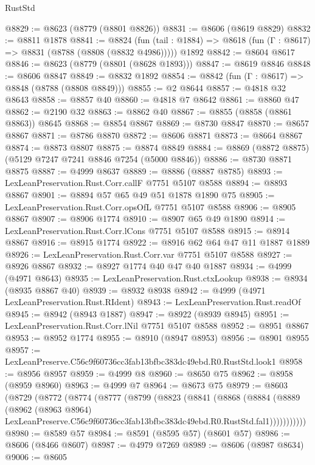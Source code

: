 \begin{lexlean}{RustStd}
\begin{coremodule}
@8829 := @8623 (@8779 (@8801 @8826))
@8831 := @8606 (@8619 @8829)
@8832 := @8811 @1878
@8841 := @8824
    (fun (tail : @1884) => @8618 (fun (Γ : @8617) => @8831 (@8788 (@8808 (@8832 @4986)))))
    @1892
@8842 := @8604 @8617
@8846 := @8623 (@8779 (@8801 (@8628 @1893)))
@8847 := @8619 @8846
@8848 := @8606 @8847
@8849 := @8832 @1892
@8854 := @8842 (fun (Γ : @8617) => @8848 (@8788 (@8808 @8849)))
@8855 := @2 @8644
@8857 := @4818 @32 @8643
@8858 := @8857 @40
@8860 := @4818 @7 @8642
@8861 := @8860 @47
@8862 := @2190 @32
@8863 := @8862 @40
@8867 := @8855 (@8858 (@8861 @8863)) @8645
@8868 := @8854 @8867
@8869 := @8730 @8847
@8870 := @8657 @8867
@8871 := @8786 @8870
@8872 := @8606 @8871
@8873 := @8664 @8867
@8874 := @8873 @8807
@8875 := @8874 @8849
@8884 := @8869 (@8872 @8875) (@5129 @7247 @7241 @8846 @7254 (@5000 @8846))
@8886 := @8730 @8871 @8875
@8887 := @4999 @8637
@8889 := @8886 (@8887 @8785)
@8893 := LexLeanPreservation.Rust.Corr.callF @7751 @5107 @8588
@8894 := @8893 @8867
@8901 := @8894 @57 @65 @49 @51 @1878 @1890 @75
@8905 := LexLeanPreservation.Rust.Corr.opsOfL @7751 @5107 @8588
@8906 := @8905 @8867
@8907 := @8906 @1774
@8910 := @8907 @65 @49 @1890
@8914 := LexLeanPreservation.Rust.Corr.lCons @7751 @5107 @8588
@8915 := @8914 @8867
@8916 := @8915 @1774
@8922 := @8916 @62 @64 @47 @11 @1887 @1889
@8926 := LexLeanPreservation.Rust.Corr.var @7751 @5107 @8588
@8927 := @8926 @8867
@8932 := @8927 @1774 @40 @47 @40 @1887
@8934 := @4999 (@4971 @8643)
@8935 := LexLeanPreservation.Rust.ctxLookup
@8938 := @8934 (@8935 @8867 @40)
@8939 := @8932 @8938
@8942 := @4999 (@4971 LexLeanPreservation.Rust.RIdent)
@8943 := LexLeanPreservation.Rust.readOf
@8945 := @8942 (@8943 @1887)
@8947 := @8922 (@8939 @8945)
@8951 := LexLeanPreservation.Rust.Corr.lNil @7751 @5107 @8588
@8952 := @8951 @8867
@8953 := @8952 @1774
@8955 := @8910 (@8947 @8953)
@8956 := @8901 @8955
@8957 := LexLeanPreserve.C56c9f60736cc3fab13bfbc383dc49ebd.R0.RustStd.look1
@8958 := @8956 @8957
@8959 := @4999 @8
@8960 := @8650 @75
@8962 := @8958 (@8959 @8960)
@8963 := @4999 @7
@8964 := @8673 @75
@8979 := @8603
    (@8729
      (@8772
        (@8774
          (@8777
            (@8799
              (@8823
                (@8841
                  (@8868
                    (@8884
                      (@8889
                        (@8962
                          (@8963 @8964)
                          LexLeanPreserve.C56c9f60736cc3fab13bfbc383dc49ebd.R0.RustStd.fal1)))))))))))
@8980 := @8589 @57
@8984 := @8591 (@8595 @57) (@8601 @57)
@8986 := @8606 (@8466 @8607)
@8987 := @4979 @7269
@8989 := @8606 (@8987 @8634)
@9006 := @8605

\end{coremodule}
\end{lexlean}
